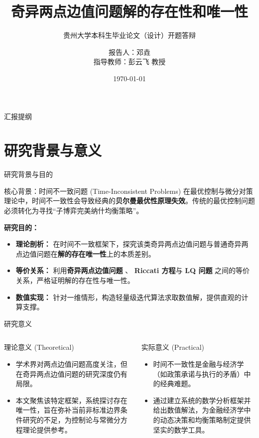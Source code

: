 \documentclass[aspectratio=169, 10pt]{ctexbeamer}
\title[开题报告：奇异两点边值问题]{奇异两点边值问题解的存在性和唯一性}
\subtitle{贵州大学本科生毕业论文（设计）开题答辩}
\author[邓垚]{报告人：邓垚 \\ \vspace{0.2cm} 指导教师：彭云飞 \quad 教授}
\institute[贵州大学]{贵州大学 \quad 数学与统计学院 \quad 应数2201班}
\date{\today}
\begin{document}
	
	\begin{frame}
		\titlepage
	\end{frame}
	
	\begin{frame}{汇报提纲}
		\tableofcontents[hideallsubsections]
	\end{frame}
	
	\section{研究背景与意义}
	
	\begin{frame}{研究背景与目的}
		\begin{block}{核心背景：时间不一致问题 (Time-Inconsistent Problems)}
			在最优控制与微分对策理论中，时间不一致性会导致经典的\textbf{贝尔曼最优性原理失效}。传统的最优控制问题必须转化为寻找“子博弈完美纳什均衡策略”。
		\end{block}
		
		\vspace{0.3cm}
		\textbf{\textcolor{AcademicBlue}{研究目的：}}
		\begin{itemize}
			\item \textbf{理论剖析：} 在时间不一致框架下，探究该类奇异两点边值问题与普通奇异两点边值问题在\textbf{解的存在唯一性}上的本质差别。
			\item \textbf{等价关系：} 利用\textbf{奇异两点边值问题} 、 \textbf{Riccati 方程}与 \textbf{LQ 问题} 之间的等价关系，严格证明解的存在性与唯一性。
			\item \textbf{数值实现：} 针对一维情形，构造轻量级迭代算法求取数值解，提供直观的计算支撑。
		\end{itemize}
	\end{frame}
	
	\begin{frame}{研究意义}
		\begin{columns}
			\column{0.5\textwidth}
			\begin{exampleblock}{理论意义 (Theoretical)}
				\begin{itemize}
					\item 学术界对两点边值问题高度关注，但在奇异两点边值问题的研究深度仍有局限。
					\item 本文聚焦该特定框架，系统探讨存在唯一性，旨在弥补当前非标准边界条件研究的不足，为控制论与常微分方程理论提供参考。
				\end{itemize}
			\end{exampleblock}
			
			\column{0.5\textwidth}
			\begin{block}{实际意义 (Practical)}
				\begin{itemize}
					\item 时间不一致性是金融与经济学（如政策承诺与执行的矛盾）中的经典难题。
					\item 通过建立系统的数学分析框架并给出数值解法，为金融经济学中的动态决策和均衡策略制定提供坚实的数学工具。
				\end{itemize}
			\end{block}
		\end{columns}
	\end{frame}
	
\end{document}
